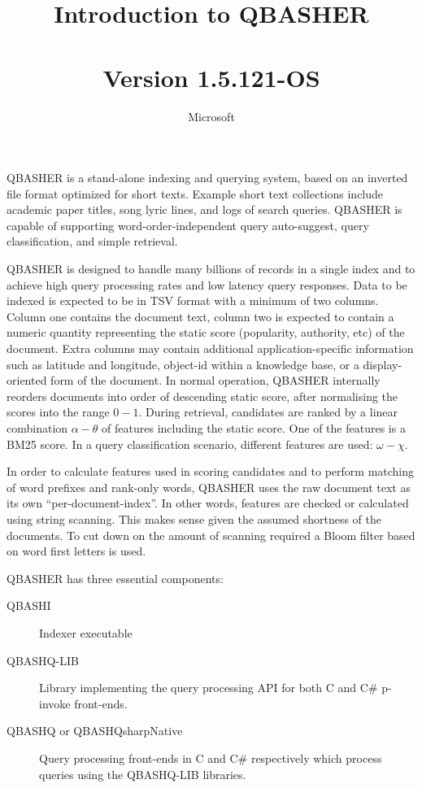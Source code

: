 \documentclass{article}
\title{Introduction to QBASHER\\
  \large ~\\
  Version 1.5.121-OS}
\author{Microsoft}
\begin{document}
\maketitle{}


QBASHER is a stand-alone indexing and querying system, based on an
inverted file format optimized for short texts.  Example short text
collections include academic paper titles, song lyric lines, and logs
of search queries.  QBASHER is capable of supporting
word-order-independent query auto-suggest, query
classification, and simple retrieval.

QBASHER is designed to handle many billions of records in a single
index and to achieve high query processing rates and low latency query
responses.  Data to be indexed is expected to be in TSV format with a
minimum of two columns.  Column one contains the document text, column
two is expected to contain a numeric quantity representing the static
score (popularity, authority, etc) of the document. Extra columns
may contain additional application-specific information such as
latitude and longitude, object-id within a knowledge base, or a
display-oriented form of the document.   In normal operation, QBASHER
internally reorders documents into order of descending static score,
after normalising the scores into the range $0-1$.  During retrieval,
candidates are ranked by a linear combination $\alpha - \theta$ of
features including the static score.  One of the features is a BM25
score. In a query classification scenario, different features are
used: $\omega - \chi$.

In order to calculate features used in scoring candidates and to
perform matching of word prefixes and rank-only words, QBASHER uses
the raw document text as its own ``per-document-index''.  In other
words, features are checked or calculated using string scanning.  This
makes sense given the assumed shortness of the documents.  To cut down
on the amount of scanning required a Bloom filter based on word first
letters is used.

QBASHER has three essential components:

\begin{description}
\item [QBASHI] Indexer executable
  \item [QBASHQ-LIB] Library implementing the query processing API for
    both C and C\# p-invoke front-ends.
    \item [QBASHQ or QBASHQsharpNative] Query processing front-ends
      in C and C\# respectively which process queries using the
      QBASHQ-LIB libraries.
\end{description}
\end{document}
